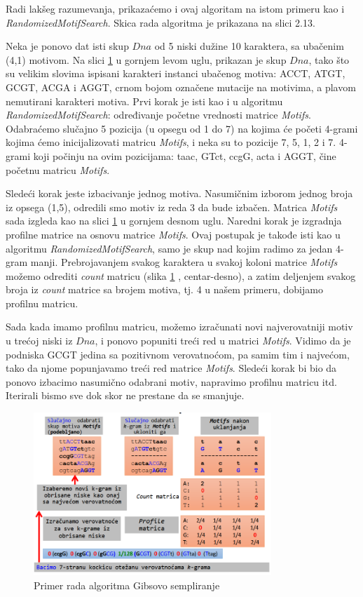 Radi lakšeg razumevanja, prikazaćemo i ovaj algoritam na istom primeru kao i \textit{RandomizedMotifSearch}. Skica rada algoritma je prikazana na slici 2.13.

Neka je ponovo dat isti skup $Dna$ od 5 niski dužine 10 karaktera, sa ubačenim (4,1) motivom. Na slici \ref{slika: gibs} u gornjem levom uglu, prikazan je skup $Dna$, tako što su velikim slovima ispisani karakteri instanci ubačenog motiva: ACCT, ATGT, GCGT, ACGA i AGGT, crnom bojom označene mutacije na motivima, a plavom nemutirani karakteri motiva. Prvi korak je isti kao i u algoritmu \textit{RandomizedMotifSearch}: određivanje početne vrednosti matrice \textit{Motifs}. Odabraćemo slučajno 5 pozicija (u opsegu od 1 do 7) na kojima će početi 4-grami kojima ćemo inicijalizovati matricu \textit{Motifs}, i neka su to pozicije 7, 5, 1, 2 i 7. 4-grami koji počinju na ovim pozicijama: taac, GTct, ccgG, acta i AGGT, čine početnu matricu \textit{Motifs}. 

Sledeći korak jeste izbacivanje jednog motiva. Nasumičnim izborom jednog broja iz opsega (1,5), odredili smo motiv iz reda 3 da bude izbačen. Matrica \textit{Motifs} sada izgleda kao na slici \ref{slika: gibs} u gornjem desnom uglu. Naredni korak je izgradnja profilne matrice na osnovu matrice \textit{Motifs}. Ovaj postupak je takođe isti kao u algoritmu \textit{RandomizedMotifSearch}, samo je skup nad kojim radimo za jedan 4-gram manji. Prebrojavanjem svakog karaktera u svakoj koloni matrice \textit{Motifs} možemo odrediti \textit{count} matricu (slika \ref{slika: gibs} , centar-desno), a zatim deljenjem svakog broja iz \textit{count} matrice sa brojem motiva, tj. 4 u našem primeru, dobijamo profilnu matricu. 

Sada kada imamo profilnu matricu, možemo izračunati novi najverovatniji motiv u trećoj niski iz $Dna$, i ponovo popuniti treći red u matrici \textit{Motifs}. Vidimo da je podniska GCGT jedina sa pozitivnom verovatnoćom, pa samim tim i najvećom, tako da njome popunjavamo treći red matrice \textit{Motifs}. Sledeći korak bi bio da ponovo izbacimo nasumično odabrani motiv, napravimo profilnu matricu itd. Iterirali bismo sve dok skor ne prestane da se smanjuje. 


\begin{figure}[h]
\centering
\includegraphics[width=0.8\textwidth]{poglavlja/2/slike/73.PNG}
\caption{Primer rada algoritma Gibsovo sempliranje}
\label{slika: gibs}
\end{figure}

